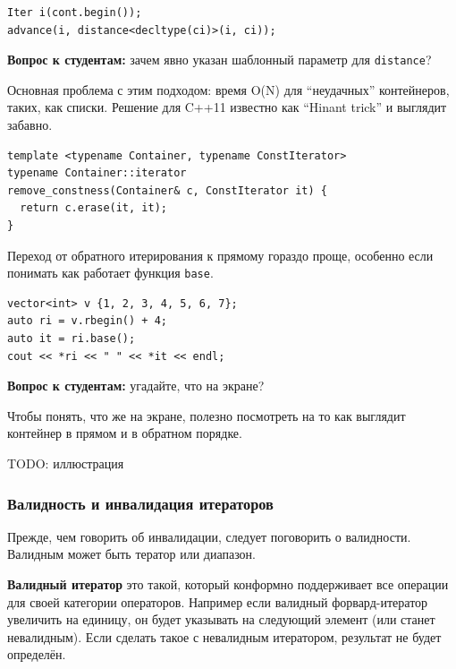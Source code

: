 \documentclass[a4paper,12pt,oneside]{article}
\newif\ifanswers
\begin{document}
\begin{lstlisting}
Iter i(cont.begin());
advance(i, distance<decltype(ci)>(i, ci));
\end{lstlisting}

\textbf{Вопрос к студентам:} зачем явно указан шаблонный параметр для \lstinline!distance!?

\ifanswers
Чтобы избежать неоднозначности вывода типов межу итератором и константным итератором
\fi

Основная проблема с этим подходом: время O(N) для ``неудачных'' контейнеров, таких, как списки. Решение для C++11 известно как ``Hinant trick'' и выглядит забавно.

\begin{lstlisting}
template <typename Container, typename ConstIterator>
typename Container::iterator 
remove_constness(Container& c, ConstIterator it) {
  return c.erase(it, it);
}
\end{lstlisting}

Переход от обратного итерирования к прямому гораздо проще, особенно если понимать как работает функция \lstinline!base!.

\begin{lstlisting}
vector<int> v {1, 2, 3, 4, 5, 6, 7};
auto ri = v.rbegin() + 4; 
auto it = ri.base();
cout << *ri << " " << *it << endl;
\end{lstlisting}

\textbf{Вопрос к студентам:} угадайте, что на экране?

\ifanswers
ответ 3 и 4, пояснения см. далее в тексте
\fi

Чтобы понять, что же на экране, полезно посмотреть на то как выглядит контейнер в прямом и в обратном порядке.

TODO: иллюстрация

\subsubsection{Валидность и инвалидация итераторов}\label{subsub:valinval}

Прежде, чем говорить об инвалидации, следует поговорить о валидности. Валидным может быть тератор или диапазон.

\textbf{Валидный итератор} это такой, который конформно поддерживает все операции для своей категории операторов. Например если валидный форвард-итератор увеличить на единицу, он будет указывать на следующий элемент (или станет невалидным). Если сделать такое с невалидным итератором, результат не будет определён.
\end{document}
